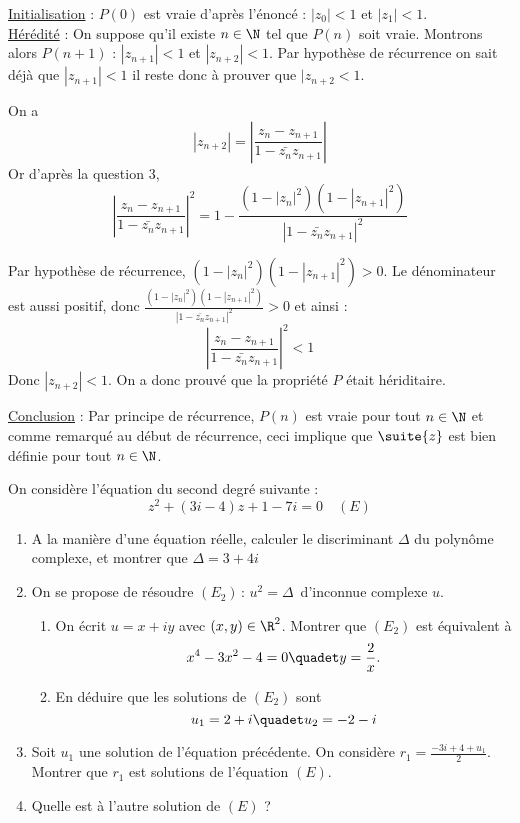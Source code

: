 \documentclass[a4paper, 11pt,reqno]{article}
\begin{document}
\begin{correction}
\begin{enumerate}
\underline{Initialisation} : 
$P(0)$ est vraie d'après l'énoncé : $|z_0|<1 $ et $|z_1|<1$.\\

\underline{Hérédité} : On suppose qu'il existe $n\in \N$   tel que $P(n)$ soit vraie. Montrons alors $P(n+1)$ :  \og $|z_{n+1}|<1$ et $|z_{n+2}|<1$\fg. Par hypothèse de récurrence on sait déjà que $|z_{n+1}|<1$ il reste donc à prouver que $|z_{n+2} <1$. 

On a $$|z_{n+2}| = \left|\frac{z_n-z_{n+1}}{1-\bar{z_{n}} z_{n+1}}\right|$$
 Or d'après la question 3, 
 $$ \left|\frac{z_n-z_{n+1}}{1-\bar{z_{n}} z_{n+1}}\right|^2 = 1- \frac{(1-|z_n|^2) (1-|z_{n+1}|^2) }{|1-\bar{z_n} z_{n+1}  |^2}$$
 
Par hypothèse de récurrence,  $(1-|z_n|^2) (1-|z_{n+1}|^2)>0$. Le dénominateur est aussi positif, donc $\frac{(1-|z_n|^2) (1-|z_{n+1}|^2) }{|1-\bar{z_n} z_{n+1}  |^2}>0$ et ainsi :
 $$ \left|\frac{z_n-z_{n+1}}{1-\bar{z_{n}} z_{n+1}}\right|^2 < 1$$
Donc $|z_{n+2}|<1$. On a donc prouvé que la propriété $P$ était hériditaire. 

\underline{Conclusion} : Par principe de récurrence, $P(n)$ est vraie pour tout $n\in \N$ et comme remarqué au début de récurrence, ceci implique que $\suite{z}$ est bien définie pour tout $n\in \N$.  

 
\end{enumerate}
\end{correction}



\begin{exercice}
On considère l'équation du second degré suivante : 
$$z^2+(3i-4)z+1-7i=0 \quad (E) $$

\begin{enumerate}
\item A la manière d'une équation réelle, calculer le discriminant $\Delta$ du polynôme complexe, et montrer que $\Delta=3+4i$
\item On se propose de résoudre $ (E_2) \, : \, u^2=\Delta \, $  d'inconnue complexe $u$. 
\begin{enumerate}
\item On écrit $u=x+iy$ avec $(x,y)\in \R^2$. Montrer que $(E_2)$ est équivalent à 
$$ x^4-3x^2-4=0 \quadet y =\frac{2}{x}.$$
\item En déduire que les solutions de $(E_2)$ sont 
$$u_1=2+i\quadet u_2=-2-i$$
\end{enumerate}
\item Soit $u_1$ une solution de l'équation précédente. 
On considère $r_1 = \frac{-3i+4 +u_1}{2}$. Montrer que $r_1$ est solutions de l'équation  $(E)$.
\item Quelle est à l'autre solution  de  $(E)$ ? 
\end{enumerate}

\end{exercice}
\end{document}
